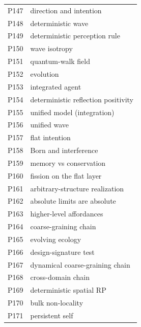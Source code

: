 \begin{small}
\begin{longtable}{p{0.7cm}p{13.5cm}}
P147 & direction and intention \\
P148 & deterministic wave \\
P149 & deterministic perception rule \\
P150 & wave isotropy \\
P151 & quantum-walk field \\
P152 & evolution \\
P153 & integrated agent \\
P154 & deterministic reflection positivity \\
P155 & unified model (integration) \\
P156 & unified wave \\
P157 & flat intention \\
P158 & Born and interference \\
P159 & memory vs conservation \\
P160 & fission on the flat layer \\
P161 & arbitrary-structure realization \\
P162 & absolute limits are absolute \\
P163 & higher-level affordances \\
P164 & coarse-graining chain \\
P165 & evolving ecology \\
P166 & design-signature test \\
P167 & dynamical coarse-graining chain \\
P168 & cross-domain chain \\
P169 & deterministic spatial RP \\
P170 & bulk non-locality \\
P171 & persistent self \\
\bottomrule
\end{longtable}
\end{small}
